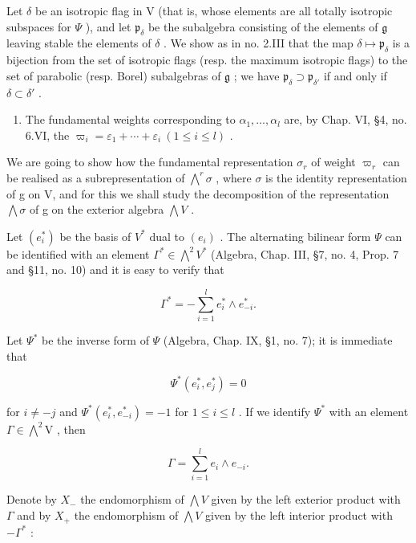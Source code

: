 Let \(\delta\) be an isotropic flag in V (that is, whose elements are all totally isotropic subspaces for \(\varPsi\) ), and let \(\mathfrak{p}_{\delta}\) be the subalgebra consisting of the elements of \(\mathfrak{g}\) leaving stable the elements of \(\delta\) . We show as in no. 2.III that the map \(\delta \mapsto \mathfrak{p}_{\delta}\) is a bijection from the set of isotropic flags (resp. the maximum isotropic flags) to the set of parabolic (resp. Borel) subalgebras of \(\mathfrak{g}\) ; we have \(\mathfrak{p}_{\delta} \supset \mathfrak{p}_{\delta'}\) if and only if \(\delta \subset \delta'\) .

\begin{enumerate}
\def\labelenumi{(\Roman{enumi})}
\setcounter{enumi}{3}
\tightlist
\item
  The fundamental weights corresponding to \(\alpha_{1},\ldots,\alpha_{l}\) are, by Chap. VI, §4, no. 6.VI, the \(\varpi_{i}=\varepsilon_{1}+\cdots+\varepsilon_{i}\ (1\leq i\leq l)\) .
\end{enumerate}

We are going to show how the fundamental representation \(\sigma_{r}\) of weight \(\varpi_{r}\) can be realised as a subrepresentation of \(\bigwedge^{r}\sigma\) , where \(\sigma\) is the identity representation of g on V, and for this we shall study the decomposition of the representation \(\bigwedge\sigma\) of g on the exterior algebra \(\bigwedge V\) .

Let \((e_{i}^{*})\) be the basis of \(V^{*}\) dual to \((e_{i})\) . The alternating bilinear form \(\varPsi\) can be identified with an element \(\varGamma^{*}\in\bigwedge^{2}V^{*}\) (Algebra, Chap. III, §7, no. 4, Prop. 7 and §11, no. 10) and it is easy to verify that

\[
\Gamma^ {*} = - \sum_ {i = 1} ^ {l} e _ {i} ^ {*} \wedge e _ {- i} ^ {*}.
\]

Let \(\varPsi^{*}\) be the inverse form of \(\varPsi\) (Algebra, Chap. IX, §1, no. 7); it is immediate that

\[
\varPsi^ {*} (e _ {i} ^ {*}, e _ {j} ^ {*}) = 0
\]

for \(i \neq -j\) and \(\Psi^{*}(e_{i}^{*}, e_{-i}^{*}) = -1\) for \(1 \leq i \leq l\) . If we identify \(\Psi^{*}\) with an element \(\Gamma \in \bigwedge^{2}\mathrm{V}\) , then

\[
\Gamma = \sum_ {i = 1} ^ {l} e _ {i} \wedge e _ {- i}.
\]

Denote by \(X_{-}\) the endomorphism of \(\bigwedge V\) given by the left exterior product with \(\Gamma\) and by \(X_{+}\) the endomorphism of \(\bigwedge V\) given by the left interior product with \(-\Gamma^{*}\) :

